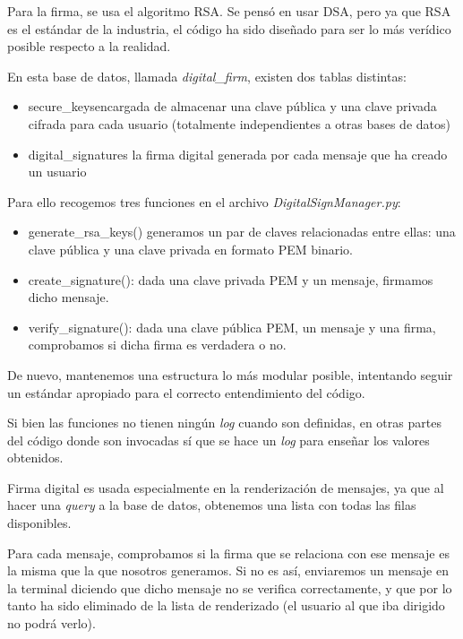 \documentclass[a4paper,11pt]{article}
\begin{document}
Para la firma, se usa el algoritmo RSA. Se pensó en usar DSA, pero ya que RSA es el estándar de la industria, el código ha sido diseñado para ser lo más verídico posible respecto a la realidad.

En esta base de datos, llamada \textit{digital\_firm}, existen dos tablas distintas:
\begin{itemize}
    \item secure\_keys\:encargada de almacenar una clave pública y una clave privada cifrada para cada usuario (totalmente independientes a otras bases de datos)
    \item digital\_signatures\: la firma digital generada por cada mensaje que ha creado un usuario
\end{itemize}

Para ello recogemos tres funciones en el archivo \textit{DigitalSignManager.py}:
\begin{itemize}
    \item generate\_rsa\_keys()\: generamos un par de claves relacionadas entre ellas: una clave pública y una clave privada en formato PEM binario.
    \item create\_signature(): dada una clave privada PEM y un mensaje, firmamos dicho mensaje.
    \item verify\_signature(): dada una clave pública PEM, un mensaje y una firma, comprobamos si dicha firma es verdadera o no.
\end{itemize}

De nuevo, mantenemos una estructura lo más modular posible, intentando seguir un estándar apropiado para el correcto entendimiento del código. 

Si bien las funciones no tienen ningún \textit{log} cuando son definidas, en otras partes del código donde son invocadas sí que se hace un \textit{log} para enseñar los valores obtenidos.

Firma digital es usada especialmente en la renderización de mensajes, ya que al hacer una \textit{query} a la base de datos, obtenemos una lista con todas las filas disponibles. 

Para cada mensaje, comprobamos si la firma que se relaciona con ese mensaje es la misma que la que nosotros generamos. Si no es así, enviaremos un mensaje en la terminal diciendo que dicho mensaje no se verifica correctamente, y que por lo tanto ha sido eliminado de la lista de renderizado (el usuario al que iba dirigido no podrá verlo).
\end{document}
